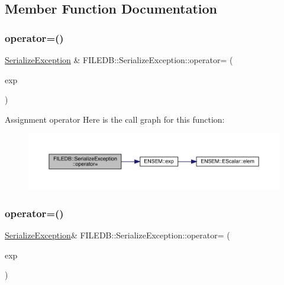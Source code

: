 \subsection{Member Function Documentation}
\mbox{\label{classFILEDB_1_1SerializeException_a0333bfcab2cc76905ff3507f84148051}} 
\subsubsection{\texorpdfstring{operator=()}{operator=()}\hspace{0.1cm}{\footnotesize\ttfamily [1/3]}}
{\footnotesize\ttfamily \mbox{\hyperlink{classFILEDB_1_1SerializeException}{Serialize\+Exception}} \& F\+I\+L\+E\+D\+B\+::\+Serialize\+Exception\+::operator= (\begin{DoxyParamCaption}\item[{const \mbox{\hyperlink{classFILEDB_1_1SerializeException}{Serialize\+Exception}} \&}]{exp }\end{DoxyParamCaption})}

Assignment operator Here is the call graph for this function\+:
\nopagebreak
\begin{figure}[H]
\begin{center}
\leavevmode
\includegraphics[width=350pt]{d3/d5a/classFILEDB_1_1SerializeException_a0333bfcab2cc76905ff3507f84148051_cgraph}
\end{center}
\end{figure}
\mbox{\label{classFILEDB_1_1SerializeException_a6ec9d7b0679c5752e900d30b92015302}} 
\subsubsection{\texorpdfstring{operator=()}{operator=()}\hspace{0.1cm}{\footnotesize\ttfamily [2/3]}}
{\footnotesize\ttfamily \mbox{\hyperlink{classFILEDB_1_1SerializeException}{Serialize\+Exception}}\& F\+I\+L\+E\+D\+B\+::\+Serialize\+Exception\+::operator= (\begin{DoxyParamCaption}\item[{const \mbox{\hyperlink{classFILEDB_1_1SerializeException}{Serialize\+Exception}} \&}]{exp }\end{DoxyParamCaption})}

